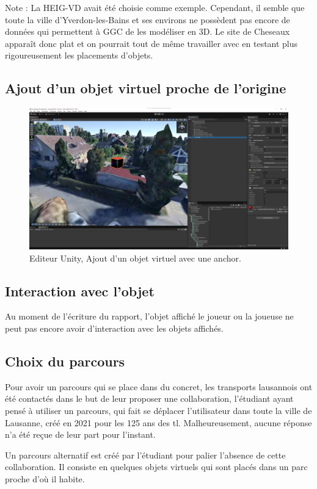 Note : La HEIG-VD avait été choisie comme exemple. Cependant, il semble que toute la ville d'Yverdon-les-Bains et ses environs ne possèdent pas encore
de données qui permettent à GGC de les modéliser en 3D. Le site de Cheseaux apparaît donc plat et on pourrait tout de même travailler avec
en testant plus rigoureusement les placements d'objets.

\subsection{Ajout d'un objet virtuel proche de l'origine}
\begin{figure}[H]
    \centering
    \includegraphics[width=1\linewidth]{assets/figures/Screenshots/GGC_3.png}
    \caption{Editeur Unity, Ajout d'un objet virtuel avec une anchor.}
    \label{fig:GGC_3}
\end{figure}
\subsection{Interaction avec l'objet}
Au moment de l'écriture du rapport, l'objet affiché le joueur ou la joueuse ne peut pas encore avoir d'interaction avec les objets affichés.
\subsection{Choix du parcours}
Pour avoir un parcours qui se place dans du concret, les transports lausannois
ont été contactés dans le but de leur proposer une collaboration, l'étudiant ayant pensé à
utiliser un parcours, qui fait se déplacer l'utilisateur dans toute la ville de Lausanne,
créé en 2021 pour les 125 ans des tl.\cite{hatetVeriteLionsLausannois2021} Malheureusement, aucune réponse n'a été reçue de leur
part pour l'instant.

Un parcours alternatif est créé par l'étudiant pour palier l'absence de
cette collaboration. Il consiste en quelques objets virtuels qui sont placés dans un parc proche d'où il habite.

